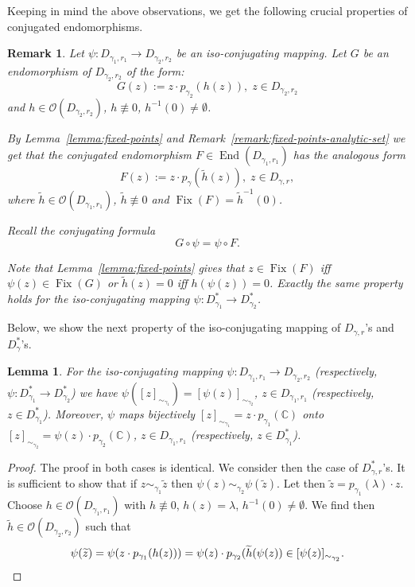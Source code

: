 \documentclass[a4paper,12pt]{amsart}
\DeclareMathOperator{\enmo}{End}
\DeclareMathOperator{\Fix}{Fix}
\newtheorem{lemma}[theorem]{Lemma}
\newtheorem{remark}[theorem]{Remark}
\theoremstyle{definition}
\begin{document}
Keeping in mind the above observations, we get the following crucial properties of conjugated endomorphisms.

\begin{remark} Let $\psi\colon D_{\gamma_1,r_1}\to D_{\gamma_2,r_2}$ be an iso-conjugating mapping. Let $G$ be an endomorphism of $D_{\gamma_2,r_2}$ of the form:
\begin{equation}
    G(z):= z\cdot p_{\gamma_2}(h(z)),\; z\in D_{\gamma_2,r_2}
\end{equation}
and $h\in\mathcal O(D_{\gamma_2,r_2})$, $h\not\equiv 0$, $h^{-1}(0)\neq\emptyset$.

By Lemma~\ref{lemma:fixed-points} and Remark~\ref{remark:fixed-points-analytic-set} we get that the conjugated endomorphism $F\in\enmo(D_{\gamma_1,r_1})$ has the analogous form
\begin{equation}
F(z):=z\cdot p_{\gamma}(\tilde h(z)),\; z\in D_{\gamma,r},
\end{equation}
where $\tilde h\in\mathcal O(D_{\gamma_1,r_1})$, $\tilde h\not\equiv 0$ and $\Fix (F)=\tilde h^{-1}(0)$. 

Recall the conjugating formula
\begin{equation}
    G\circ\psi=\psi\circ F.
\end{equation}

Note that Lemma~\ref{lemma:fixed-points} gives that  $z\in \Fix(F)$ iff $\psi(z)\in\Fix(G)$ or $\tilde h(z)=0$ iff $h(\psi(z))=0$. 
Exactly the same property holds for the iso-conjugating mapping  $\psi \colon D_{\gamma_1}^*\to D_{\gamma_2}^*$.
\end{remark}

Below, we show the next property of the iso-conjugating mapping of $D_{\gamma,r}$'s and $D_{\gamma}^*$'s.

\begin{lemma}\label{lemma-equivalence-classes} For the iso-conjugating mapping $\psi \colon D_{\gamma_1,r_1}\to D_{\gamma_2,r_2}$ (respectively, $\psi \colon D_{\gamma_1}^*\to D_{\gamma_2}^*$) we have
$\psi([z]_{\sim_{\gamma_1}})=[\psi(z)]_{\sim_{\gamma_2}}$, $z\in D_{\gamma_1,r_1}$ (respectively, $z\in D_{\gamma_1}^*$). Moreover, $\psi$ maps bijectively $[z]_{\sim_{\gamma_1}}=z\cdot p_{\gamma_1}(\mathbb C)$ onto $[z]_{\sim_{\gamma_2}}=\psi(z)\cdot p_{\gamma_2}(\mathbb C)$, $z\in D_{\gamma_1,r_1}$ (respectively, $z\in D_{\gamma_1}^*$).
\end{lemma}
\begin{proof} The proof in both cases is identical. We consider then the case of $D_{\gamma,r}^*$'s. It is sufficient to show that if $z\sim_{\gamma_1} \widetilde{z}$ then $\psi(z)\sim_{\gamma_2}\psi(\widetilde{z})$. Let then $\widetilde{z}=p_{\gamma_1}(\lambda)\cdot z$. Choose $h\in\mathcal O(D_{\gamma_1,r_1})$ with $h\not\equiv 0$, $h(z)=\lambda$, $h^{-1}(0)\neq\emptyset$. We find then $\widetilde{h}\in\mathcal O(D_{\gamma_2,r_2})$ such that 
\begin{equation}
    \psi(\widetilde{z})=\psi(z\cdot p_{\gamma_1}(h(z)))=\psi(z)\cdot p_{\gamma_2}(\widetilde{h}(\psi(z))\in [\psi(z)]_{\sim_{\gamma_2}}. \qedhere
\end{equation}
\end{proof}
\end{document}
